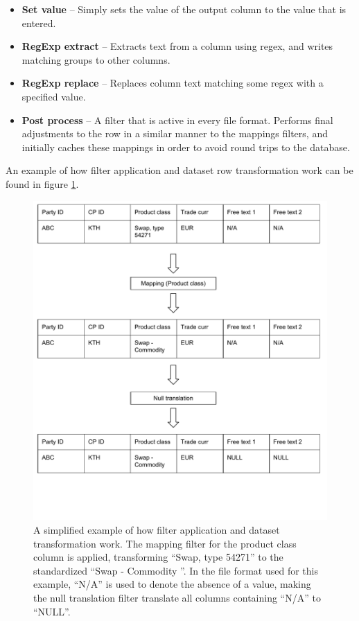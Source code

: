 \begin{itemize}
\item \textbf{Set value} --
Simply sets the value of the output column to the value that is entered.

\item \textbf{RegExp extract} --
Extracts text from a column using regex, and writes matching groups to other columns.

\item \textbf{RegExp replace} --
Replaces column text matching some regex with a specified value.

\item \textbf{Post process} --
A filter that is active in every file format. Performs final adjustments to the row in a similar manner to the mappings filters, and
initially caches these mappings in order to avoid round trips to the database.

\end{itemize}

An example of how filter application and dataset row transformation work can be found in figure \ref{fig:filter_diagram}.

\begin{figure}[ht]
  \centering
  \includegraphics[width=120mm]{figures/filter_diagram.pdf}
  \caption[Filter application example.]{A simplified example of how filter application and dataset transformation work. The mapping filter for the
  product class column is applied, transforming ``Swap, type 54271'' to the standardized ``Swap - Commodity ''. In the file format used for this example,
  ``N/A'' is used to denote the absence of a value, making the null translation filter translate all columns containing ``N/A'' to ``NULL''.}
  \label{fig:filter_diagram}
\end{figure}

